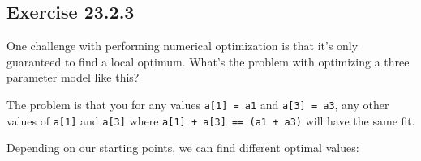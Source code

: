 \documentclass[]{book}
\newenvironment{Shaded}{\begin{snugshade}}{\end{snugshade}}
\newcommand{\CommentTok}[1]{\textcolor[rgb]{0.56,0.35,0.01}{\textit{#1}}}
\newcommand{\ControlFlowTok}[1]{\textcolor[rgb]{0.13,0.29,0.53}{\textbf{#1}}}
\newcommand{\DataTypeTok}[1]{\textcolor[rgb]{0.13,0.29,0.53}{#1}}
\newcommand{\DecValTok}[1]{\textcolor[rgb]{0.00,0.00,0.81}{#1}}
\newcommand{\KeywordTok}[1]{\textcolor[rgb]{0.13,0.29,0.53}{\textbf{#1}}}
\newcommand{\NormalTok}[1]{#1}
\newcommand{\OperatorTok}[1]{\textcolor[rgb]{0.81,0.36,0.00}{\textbf{#1}}}
\newcommand{\StringTok}[1]{\textcolor[rgb]{0.31,0.60,0.02}{#1}}
\theoremstyle{plain}
\theoremstyle{remark}
\begin{document}
\hypertarget{exercise-23.2.3}{%
\subsection*{\texorpdfstring{Exercise
{23.2.3}}{Exercise 23.2.3}}\label{exercise-23.2.3}}

One challenge with performing numerical optimization is that it's only
guaranteed to find a local optimum. What's the problem with optimizing a
three parameter model like this?

\begin{Shaded}
\end{Shaded}

The problem is that you for any values \texttt{a{[}1{]}\ =\ a1} and
\texttt{a{[}3{]}\ =\ a3}, any other values of \texttt{a{[}1{]}} and
\texttt{a{[}3{]}} where \texttt{a{[}1{]}\ +\ a{[}3{]}\ ==\ (a1\ +\ a3)}
will have the same fit.

\begin{Shaded}
\end{Shaded}

Depending on our starting points, we can find different optimal values:

\begin{Shaded}
\end{Shaded}
\end{document}
